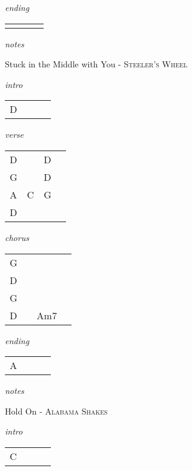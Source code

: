 \documentclass[12pt]{article}
\begin{document}
\textit{ending}

\begin{tabular}{|P{1.25in}|P{1.25in}|P{1.25in}|P{1.25in}|}
   &   &   &   \\
\end{tabular}

\textit{notes}

\newpage

{\Huge Stuck in the Middle with You} {\huge - \textsc{Steeler's Wheel}}

\huge
\textit{intro}

\begin{tabular}{|P{1.25in}|P{1.25in}|P{1.25in}|P{1.25in}|}
  D  &   &   &   \\
\end{tabular}

\textit{verse}

\begin{tabular}{|P{1.25in}|P{1.25in}|P{1.25in}|P{1.25in}|}
  D &   &  D &   \\
  G &   &  D &   \\
  A & C  &  G &  \\
  D &   &    &   \\
\end{tabular}

\textit{chorus}

\begin{tabular}{|P{1.25in}|P{1.25in}|P{1.25in}|P{1.25in}|}
  G &   &   &   \\
  D &   &   &   \\
  G &   &   &   \\
  D &   & Am7  &   \\
\end{tabular}

\textit{ending}

\begin{tabular}{|P{1.25in}|P{1.25in}|P{1.25in}|P{1.25in}|}
  A &   &   &   \\
\end{tabular}

\textit{notes}

\newpage

{\Huge Hold On} {\huge - \textsc{Alabama Shakes}}

\huge
\textit{intro}

\begin{tabular}{|P{1.25in}|P{1.25in}|P{1.25in}|P{1.25in}|}
  C &   &   &   \\
\end{tabular}
\end{document}
